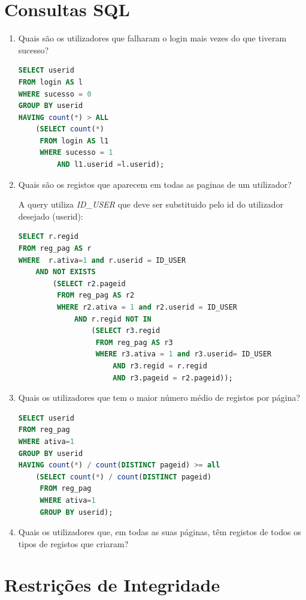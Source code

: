 \documentclass[11pt,a4paper]{article}
\begin{document}
\section{Consultas SQL}
\begin{enumerate}[label=(\alph*)]
	\item Quais são os utilizadores que falharam o login mais vezes do que tiveram sucesso?
		\begin{lstlisting}[language=SQL]
SELECT userid
FROM login AS l
WHERE sucesso = 0
GROUP BY userid
HAVING count(*) > ALL
    (SELECT count(*)
     FROM login AS l1
     WHERE sucesso = 1
         AND l1.userid =l.userid);
		\end{lstlisting}

	\item Quais são os registos que aparecem em todas as paginas de um utilizador?
	
	A query utiliza \textit{ID\_USER} que deve ser substituido pelo id do utilizador desejado (userid):
		\begin{lstlisting}[language=SQL]
SELECT r.regid
FROM reg_pag AS r
WHERE  r.ativa=1 and r.userid = ID_USER
    AND NOT EXISTS
        (SELECT r2.pageid
         FROM reg_pag AS r2
         WHERE r2.ativa = 1 and r2.userid = ID_USER 
             AND r.regid NOT IN
                 (SELECT r3.regid
                  FROM reg_pag AS r3
                  WHERE r3.ativa = 1 and r3.userid= ID_USER
                      AND r3.regid = r.regid
                      AND r3.pageid = r2.pageid));
        		\end{lstlisting}
	\item Quais os utilizadores que tem o maior número médio de registos por página?
		\begin{lstlisting}[language=SQL]
SELECT userid
FROM reg_pag
WHERE ativa=1
GROUP BY userid
HAVING count(*) / count(DISTINCT pageid) >= all
    (SELECT count(*) / count(DISTINCT pageid)
     FROM reg_pag
     WHERE ativa=1
     GROUP BY userid);
		\end{lstlisting}
	
	\item Quais os utilizadores que, em todas as suas páginas, têm registos de todos os tipos de registos que criaram?
\end{enumerate}

\newpage

\section{Restrições de Integridade}
\newpage
\end{document}
